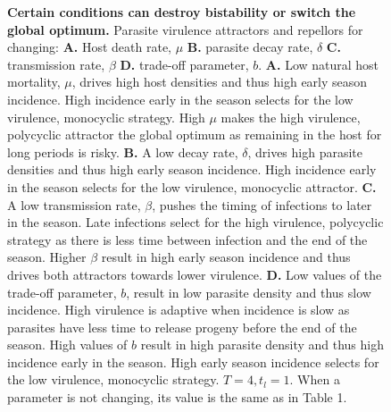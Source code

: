 \documentclass{article}
\begin{document}
\begin{figure}[hb!]
\begin{subfigure}[t]{0.45\textwidth}
  \end{subfigure}\hspace{1cm}
    \begin{subfigure}[t]{0.45\textwidth}
      \centering
  \end{subfigure}\hspace{1.5cm}
    \caption{\textbf{Certain conditions can destroy bistability or switch the global optimum.} Parasite virulence attractors and repellors for changing: \textbf{A.} Host death rate, $\mu$ \textbf{B.} parasite decay rate, $\delta$ \textbf{C.} transmission rate, $\beta$ \textbf{D.} trade-off parameter, $b$. \textbf{A.} Low natural host mortality, $\mu$, drives high host densities and thus high early season incidence. High incidence early in the season selects for the low virulence, monocyclic strategy. High $\mu$ makes the high virulence, polycyclic attractor the global optimum as remaining in the host for long periods is risky. \textbf{B.} A low decay rate, $\delta$, drives high parasite densities and thus high early season incidence. High incidence early in the season selects for the low virulence, monocyclic attractor. \textbf{C.} A low transmission rate, $\beta$, pushes the timing of infections to later in the season. Late infections select for the high virulence, polycyclic strategy as there is less time between infection and the end of the season. Higher $\beta$ result in high early season incidence and thus drives both attractors towards lower virulence.  \textbf{D.} Low values of the trade-off parameter, $b$, result in low parasite density and thus slow incidence. High virulence is adaptive when incidence is slow as parasites have less time to release progeny before the end of the season. High values of $b$ result in high parasite density and thus high incidence early in the season. High early season incidence selects for the low virulence, monocyclic strategy. 
    $T = 4, t_{l} = 1$. When a parameter is not changing, its value is the same as in Table 1. 
    }
\end{figure}
\end{document}
